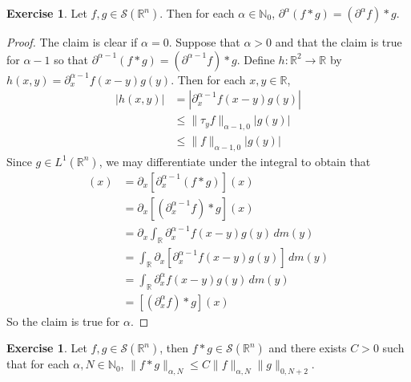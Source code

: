 \documentclass[12pt]{amsart}
\theoremstyle{definition}
\newtheorem{ex}[definition]{Exercise}
\newcommand{\p}{\partial}
\newcommand{\al}{\alpha}
\newcommand{\N}{\mathbb{N}}
\newcommand{\R}{\mathbb{R}}
\newcommand{\MS}{\mathcal{S}}
\newcommand{\dm}{\, d m}
\begin{document}
	\begin{ex}
		Let $f,g \in \MS(\R^n)$. Then for each $\al \in \N_0$, $\p^{\al}(f*g) = (\p^{\al}f)*g$.
	\end{ex}

	\begin{proof}
			The claim is clear if $\al = 0$. Suppose that $\al > 0$ and that the claim is true for $\al - 1$ so that  $\p^{\al-1}(f*g) = (\p^{\al-1}f)*g$. Define $h: \R^2 \rightarrow \R$ by $h(x,y) = \p_x^{\al-1}f(x-y)g(y)$. Then for each $x,y \in \R$, 
			\begin{align*}
				|h(x,y)| 
				& = |\p_x^{\al-1}f(x-y)g(y)| \\
				& \leq \|\tau_yf\|_{\al-1,0}|g(y)| \\
				& \leq \|f\|_{\al-1,0}|g(y)|
			\end{align*} 
			Since $g \in L^1(\R^n)$, we may differentiate under the integral to obtain that
		\begin{align*}
			[\p_x^{\al}(f*g)](x)
			& = \p_x [\p_x^{\al-1} (f*g)](x) \\
			& = \p_x [(\p_x^{\al-1}f)*g](x) \\
			& = \p_x \int_{\R} \p_x^{\al-1}f(x-y)g(y) \dm(y) \\
			& = \int_{\R} \p_x [\p_x^{\al-1}f(x-y)g(y)] \dm(y) \\
			& = \int_{\R} \p_x^{\al}f(x-y)g(y) \dm(y) \\
			& = [(\p_x^{\al}f)*g](x)
		\end{align*}
		So the claim is true for $\al$.
	\end{proof}

	\begin{ex}
		Let $f, g \in \MS(\R^n)$, then $f *g \in \MS(\R^n)$ and there exists $C >0$ such that for each $\al,N \in \N_0$, $\|f*g\|_{\al,N} \leq C\|f\|_{\al, N} \|g\|_{0, N+2}$. 
	\end{ex}
\end{document}
